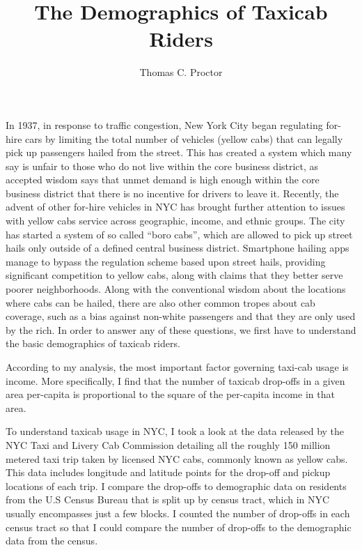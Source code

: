 \documentclass[11pt]{article}
\title{The Demographics of Taxicab Riders}
\author{Thomas C. Proctor}
\date{}
\begin{document}
\maketitle{}

  




In 1937, in response to traffic congestion, New York City began regulating for-hire cars by limiting the total number of vehicles (yellow cabs) that can legally pick up passengers hailed from the street. This has created a system which many say is unfair to those who do not live within the core business district, as accepted wisdom says that unmet demand is high enough within the core business district that there is no incentive for drivers to leave it.
Recently, the advent of other for-hire vehicles in NYC has brought further attention to issues with yellow cabs service across geographic, income, and ethnic groups.
The city has started a system of so called ``boro cabs'', which are allowed to pick up street hails only outside of a defined central business district.
Smartphone hailing apps manage to bypass the regulation scheme based upon street hails, providing significant competition to yellow cabs, along with claims that they better serve poorer neighborhoods.
Along with the conventional wisdom about the locations where cabs can be hailed, there are also other common tropes about cab coverage, such as a bias against non-white passengers and that they are only used by the rich. 
In order to answer any of these questions, we first have to understand the basic demographics of taxicab riders.

According to my analysis, the most important factor governing taxi-cab usage is income. More specifically, I find that the number of taxicab drop-offs in a given area per-capita is proportional to the square of the per-capita income in that area.

To understand taxicab usage in NYC, I took a look at the data released by the NYC Taxi and Livery Cab Commission detailing all the roughly 150 million  metered taxi trip taken by licensed NYC cabs, commonly known as yellow cabs.
This data includes longitude and latitude points for the drop-off and pickup locations of each trip.
I compare the drop-offs to demographic data on residents from the U.S Census Bureau that is split up by census tract, which in NYC usually encompasses just a few blocks. 
I counted the number of drop-offs in each census tract so that I could compare the number of drop-offs to the demographic data from the census.
\end{document}
